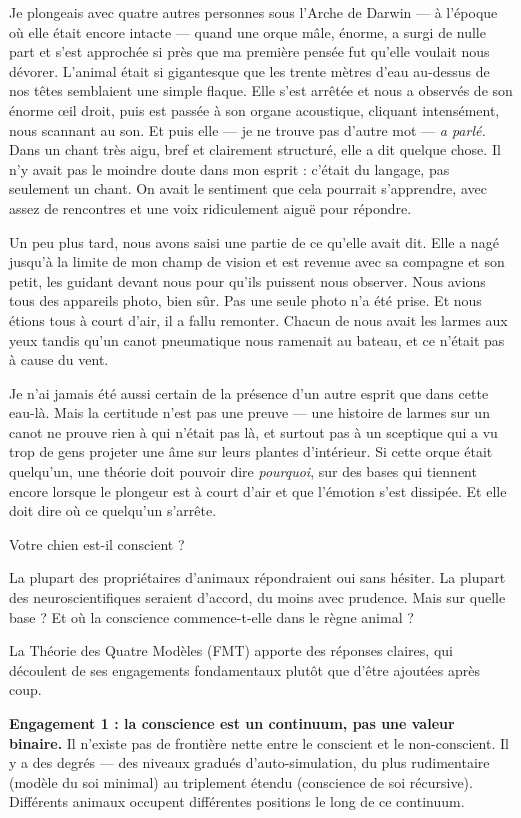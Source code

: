 \documentclass[11pt, twoside, openright]{book}
\begin{document}
Je plongeais avec quatre autres personnes sous l'Arche de Darwin --- à l'époque où elle était encore intacte --- quand une orque mâle, énorme, a surgi de nulle part et s'est approchée si près que ma première pensée fut qu'elle voulait nous dévorer. L'animal était si gigantesque que les trente mètres d'eau au-dessus de nos têtes semblaient une simple flaque. Elle s'est arrêtée et nous a observés de son énorme œil droit, puis est passée à son organe acoustique, cliquant intensément, nous scannant au son. Et puis elle --- je ne trouve pas d'autre mot --- \textit{a parlé.} Dans un chant très aigu, bref et clairement structuré, elle a dit quelque chose. Il n'y avait pas le moindre doute dans mon esprit : c'était du langage, pas seulement un chant. On avait le sentiment que cela pourrait s'apprendre, avec assez de rencontres et une voix ridiculement aiguë pour répondre.

Un peu plus tard, nous avons saisi une partie de ce qu'elle avait dit. Elle a nagé jusqu'à la limite de mon champ de vision et est revenue avec sa compagne et son petit, les guidant devant nous pour qu'ils puissent nous observer. Nous avions tous des appareils photo, bien sûr. Pas une seule photo n'a été prise. Et nous étions tous à court d'air, il a fallu remonter. Chacun de nous avait les larmes aux yeux tandis qu'un canot pneumatique nous ramenait au bateau, et ce n'était pas à cause du vent.

Je n'ai jamais été aussi certain de la présence d'un autre esprit que dans cette eau-là. Mais la certitude n'est pas une preuve --- une histoire de larmes sur un canot ne prouve rien à qui n'était pas là, et surtout pas à un sceptique qui a vu trop de gens projeter une âme sur leurs plantes d'intérieur. Si cette orque était quelqu'un, une théorie doit pouvoir dire \textit{pourquoi}, sur des bases qui tiennent encore lorsque le plongeur est à court d'air et que l'émotion s'est dissipée. Et elle doit dire où ce quelqu'un s'arrête.

Votre chien est-il conscient ?

La plupart des propriétaires d'animaux répondraient oui sans hésiter. La plupart des neuroscientifiques seraient d'accord, du moins avec prudence. Mais sur quelle base ? Et où la conscience commence-t-elle dans le règne animal ?

La Théorie des Quatre Modèles (FMT) apporte des réponses claires, qui découlent de ses engagements fondamentaux plutôt que d'être ajoutées après coup.

\textbf{Engagement 1 : la conscience est un continuum, pas une valeur binaire.} Il n'existe pas de frontière nette entre le conscient et le non-conscient. Il y a des degrés --- des niveaux gradués d'auto-simulation, du plus rudimentaire (modèle du soi minimal) au triplement étendu (conscience de soi récursive). Différents animaux occupent différentes positions le long de ce continuum.
\end{document}
